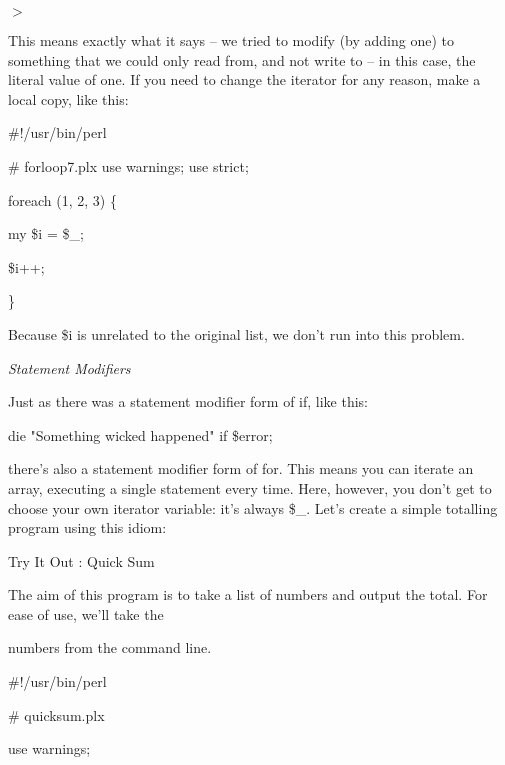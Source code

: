 \documentclass[a4paper,11pt]{book}
\begin{document}
\noindent $>$

\noindent 

\noindent This means exactly what it says -- we tried to modify (by adding one) to something that we could only read from, and not write to -- in this case, the literal value of one. If you need to change the iterator for any reason, make a local copy, like this:

\noindent 

\noindent \#!/usr/bin/perl

\noindent \# forloop7.plx use warnings; use strict;

\noindent 

\noindent foreach (1, 2, 3) \{

\noindent my \$i = \$\_;

\noindent \$i++;

\noindent \}

\noindent 

\noindent Because \$i is unrelated to the original list, we don't run into this problem.

\noindent 

\noindent \textit{Statement Modifiers}

\noindent Just as there was a statement modifier form of if, like this:

\noindent 

\noindent die "Something wicked happened" if \$error;

\noindent 

\noindent there's  also  a  statement  modifier  form  of  for.  This  means  you  can  iterate  an  array,  executing  a  single statement every time. Here, however, you don't get to choose your own iterator variable: it's always \$\_. Let's create a simple totalling program using this idiom:

\noindent 

\noindent Try It Out : Quick Sum

\noindent 

\noindent The aim of this program is to take a list of numbers and output the total.  For ease of use,  we'll take the

\noindent numbers from the command line.

\noindent 

\noindent 

\noindent \#!/usr/bin/perl

\noindent \# quicksum.plx

\noindent use warnings;
\end{document}
